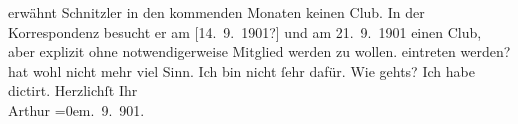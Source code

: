 \begin{ledgroupsized}[t]{13cm}
{{{                  erwähnt Schnitzler in den kommenden Monaten
                  keinen Club. In der Korrespondenz besucht er am [14. 9. 1901?] und am 21. 9. 1901
                     einen Club, aber explizit ohne notwendigerweise Mitglied werden
                     zu wollen.}}}\label{K_L01167-1h} eintreten werden? hat wohl nicht mehr viel Sinn. Ich bin nicht
               ſehr dafür. Wie gehts? Ich habe dictirt.\pend
           \pstart
           Herzlichſt Ihr{\\[\baselineskip]}\spacefill\mbox{Arthur}\pend
           \leftskip=0em{}. 9. 901.\pend
           
         
         \endnumbering{}\end{ledgroupsized}  \newcommand{\dateiname}{L01167}\newcommand{\titel}{Arthur Schnitzler an Richard Beer-Hofmann, 6. 9. 1901}\newcommand{\editorInnen}{Martin Anton Müller und Gerd-Hermann Susen}
      